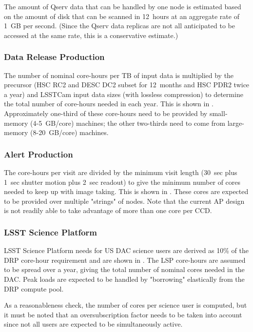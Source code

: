 The amount of Qserv data that can be handled by one node is estimated based on the amount of disk that can be scanned in 12~hours at an aggregate rate of 1~GB per second.
(Since the Qserv data replicas are not all anticipated to be accessed at the same rate, this is a conservative estimate.)

\subsubsection{Data Release Production}

The number of nominal core-hours per TB of input data is multiplied by the precursor (HSC RC2 and DESC DC2 subset for 12~months and HSC PDR2 twice a year) and LSSTCam input data sizes (with lossless compression) to determine the total number of core-hours needed in each year.
This is shown in .
Approximately one-third of these core-hours need to be provided by small-memory (4-5~GB/core) machines; the other two-thirds need to come from large-memory (8-20~GB/core) machines.



\subsubsection{Alert Production}

The core-hours per visit are divided by the minimum visit length (30~sec plus 1~sec shutter motion plus 2~sec readout) to give the minimum number of cores needed to keep up with image taking.
This is shown in .
These cores are expected to be provided over multiple "strings" of nodes.
Note that the current AP design is not readily able to take advantage of more than one core per CCD.

\subsubsection{LSST Science Platform}

LSST Science Platform needs for US DAC science users are derived as 10\% of the DRP core-hour requirement and are shown in .
The LSP core-hours are assumed to be spread over a year, giving the total number of nominal cores needed in the DAC.
Peak loads are expected to be handled by "borrowing" elastically from the DRP compute pool.

As a reasonableness check, the number of cores per science user is computed, but it must be noted that an oversubscription factor needs to be taken into account since not all users are expected to be simultaneously active.

